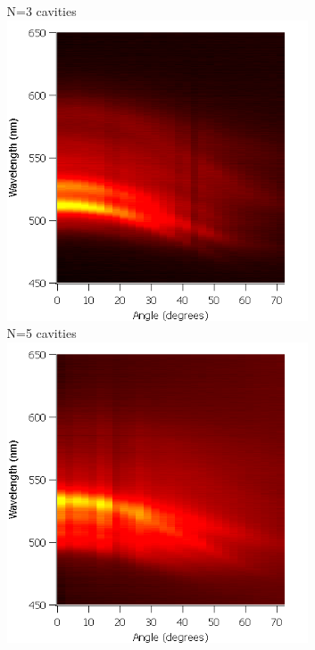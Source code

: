 \documentclass{beamer}
\begin{document}
\begin{frame}
\begin{columns}
\begin{column}{0.5\textwidth}
				\end{column}
				\begin{column}{0.5\textwidth}
					\centering
					N=3 cavities\\
					\includegraphics[width=0.7\textwidth]{images/n3_heatmap.png}\\
					N=5 cavities\\
					\includegraphics[width=0.7\textwidth]{images/n5_heatmap.png}
				\end{column}
            \end{columns}
        \end{frame}
        
\end{document}

